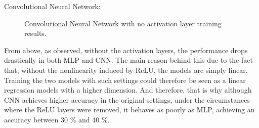\documentclass[a4paper,12pt]{article}
\begin{document}
Convolutional Neural Network:
\begin{figure}[!htb]
   \captionsetup[subfigure]{justification=centering}
   \centering
   \hspace{0.5cm}%
   \caption{Convolutional Neural Network with no activation layer training results.}
\end{figure}

From above, as observed, without the activation layers, the performance drops drastically
in both MLP and CNN. 
The main reason behind this due to the fact that, without the nonlinearity induced
by ReLU, the models are simply linear. 
Training the two models with such settings could therefore be seen as a linear regression
models with a higher dimension.
And therefore, that is why although CNN achieves higher accuracy in the original settings,
under the circumstances where the ReLU layers were removed, it behaves as poorly as MLP, 
achieving an accuracy between 30 \% and 40 \%.




% 
\end{document}
